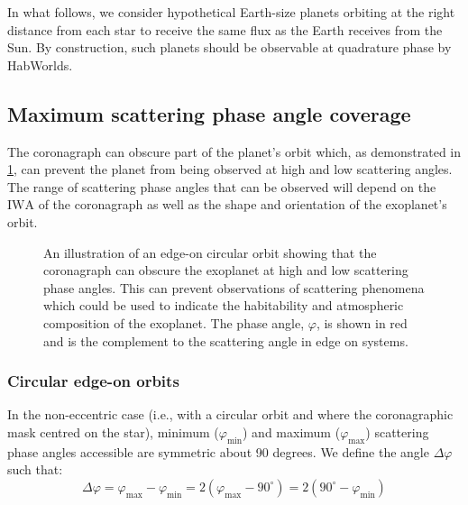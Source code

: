 \documentclass[
    usenatbib,
]{mnras}
\newcommand{\timmy}[1]{\textcolor{red}{[\textbf{Timmy:} #1]}} %
\newcommand{\IWA}{\ensuremath{\mathrm{IWA}}}
\begin{document}
In what follows, we consider hypothetical Earth-size planets orbiting at the right distance from each star to receive the same flux as the Earth receives from the Sun.
%
By construction, such planets should be observable at quadrature phase by HabWorlds. 


\subsection{Maximum scattering phase angle coverage}
\label{sec:Delta_phi}

The coronagraph can obscure part of the planet's orbit which, as demonstrated in \cref{fig:annotated-orbit}, can prevent the planet from being observed at high and low scattering angles. 
%
The range of scattering phase angles that can be observed will depend on the \IWA{} of the coronagraph as well as the shape and orientation of the exoplanet's orbit.

\begin{figure}
    \centering
    
    \caption{
        An illustration of an edge-on circular orbit showing that the coronagraph can obscure the exoplanet at high and low scattering phase angles.
        This can prevent observations of scattering phenomena which could be used to indicate the habitability and atmospheric composition of the exoplanet. The phase angle, $\varphi$, is shown in red and is the complement to the scattering angle in edge on systems.
    }
    \label{fig:annotated-orbit}
\end{figure}


\subsubsection{Circular edge-on orbits}


In the non-eccentric case (i.e., with a circular orbit and where the coronagraphic mask centred on the star), minimum ($\varphi_\mathrm{min}$) and maximum ($\varphi_\mathrm{max}$) scattering phase angles accessible are symmetric about 90 degrees. 
%
We define the angle $\Delta \varphi$ such that: 
\begin{equation}
 \label{eq:Delta_phi}
    \Delta \varphi 
    = \varphi_\mathrm{max} - \varphi_\mathrm{min}
    =  2(\varphi_\mathrm{max} - 90^\circ) 
    =  2(90^\circ-\varphi_\mathrm{min} ) 
\end{equation}
\end{document}
